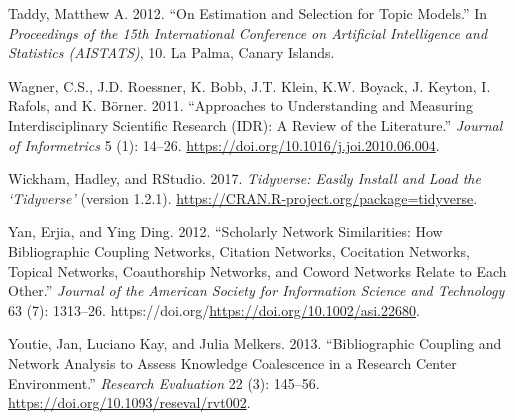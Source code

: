 \documentclass[
  11pt,
]{article}
\newlength{\cslhangindent}
\newenvironment{CSLReferences}[2] %
 {%
  \setlength{\parindent}{0pt}
  \ifodd #1 \everypar{\setlength{\hangindent}{\cslhangindent}}\ignorespaces\fi
  \ifnum #2 > 0
  \setlength{\parskip}{#2\baselineskip}
  \fi
 }%
 {}
\begin{document}
\begin{CSLReferences}{1}{0}
\leavevmode{}%
Taddy, Matthew A. 2012. {``On Estimation and Selection for Topic Models.''} In \emph{Proceedings of the 15th International Conference on Artificial Intelligence and Statistics (AISTATS)}, 10. La Palma, Canary Islands.

\leavevmode{}%
Wagner, C.S., J.D. Roessner, K. Bobb, J.T. Klein, K.W. Boyack, J. Keyton, I. Rafols, and K. Börner. 2011. {``Approaches to Understanding and Measuring Interdisciplinary Scientific Research (IDR): A Review of the Literature.''} \emph{Journal of Informetrics} 5 (1): 14--26. \url{https://doi.org/10.1016/j.joi.2010.06.004}.

\leavevmode{}%
Wickham, Hadley, and RStudio. 2017. \emph{Tidyverse: Easily Install and Load the {`Tidyverse'}} (version 1.2.1). \url{https://CRAN.R-project.org/package=tidyverse}.

\leavevmode{}%
Yan, Erjia, and Ying Ding. 2012. {``Scholarly Network Similarities: How Bibliographic Coupling Networks, Citation Networks, Cocitation Networks, Topical Networks, Coauthorship Networks, and Coword Networks Relate to Each Other.''} \emph{Journal of the American Society for Information Science and Technology} 63 (7): 1313--26. https://doi.org/\url{https://doi.org/10.1002/asi.22680}.

\leavevmode{}%
Youtie, Jan, Luciano Kay, and Julia Melkers. 2013. {``Bibliographic Coupling and Network Analysis to Assess Knowledge Coalescence in a Research Center Environment.''} \emph{Research Evaluation} 22 (3): 145--56. \url{https://doi.org/10.1093/reseval/rvt002}.

\end{CSLReferences}
\end{document}
